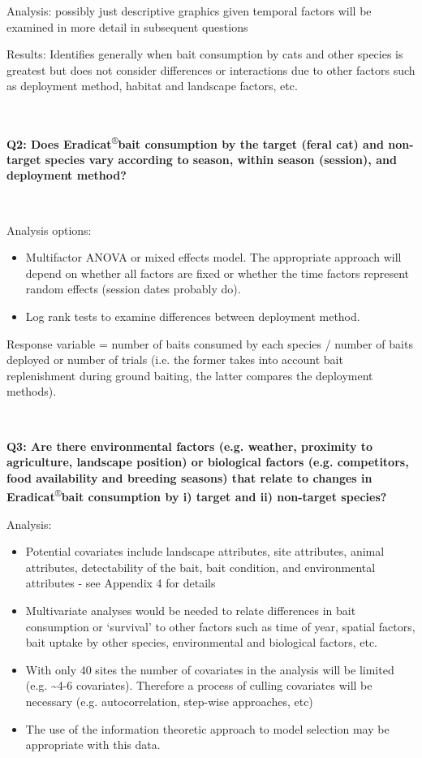 \documentclass[version=last,
    paper=a4,                               %
    10pt,                                   %
    dvipsnames,
    oneside,                              %
    headings=openany,                       %
    open=any,
    BCOR=7mm,                               %
    DIV=15,     %
]{scrbook}
\begin{document}
Analysis: possibly just descriptive graphics given temporal factors will
be examined in more detail in subsequent questions

Results: Identifies generally when bait consumption by cats and other
species is greatest but does not consider differences or interactions
due to other factors such as deployment method, habitat and landscape
factors, etc.

\textbf{~}

\textbf{Q2: Does Eradicat}\textsuperscript{®}\textbf{bait consumption by
the target (feral cat) and non-target species vary according to season,
within season (session), and deployment method?}

~

Analysis options:

\begin{itemize}
\itemsep1pt\parskip0pt
\item
  Multifactor ANOVA or mixed effects model. The appropriate approach
  will depend on whether all factors are fixed or whether the time
  factors represent random effects (session dates probably do).
\item
  Log rank tests to examine differences between deployment method.
\end{itemize}

Response variable = number of baits consumed by each species / number of
baits deployed or number of trials (i.e. the former takes into account
bait replenishment during ground baiting, the latter compares the
deployment methods).

~

\textbf{Q3: Are there environmental factors (e.g. weather, proximity to
agriculture, landscape position) or biological factors (e.g.
competitors, food availability and breeding seasons) that relate to
changes in Eradicat}\textsuperscript{®}\textbf{bait consumption by i)
target and ii) non-target species?}

Analysis:

\begin{itemize}
\itemsep1pt\parskip0pt
\item
  Potential covariates include landscape attributes, site attributes,
  animal attributes, detectability of the bait, bait condition, and
  environmental attributes - see Appendix 4 for details
\item
  Multivariate analyses would be needed to relate differences in bait
  consumption or `survival' to other factors such as time of year,
  spatial factors, bait uptake by other species, environmental and
  biological factors, etc.
\item
  With only 40 sites the number of covariates in the analysis will be
  limited (e.g. \textasciitilde{}4-6 covariates). Therefore a process of
  culling covariates will be necessary (e.g. autocorrelation, step-wise
  approaches, etc)
\item
  The use of the information theoretic approach to model selection may
  be appropriate with this data.
\end{itemize}
\end{document}
